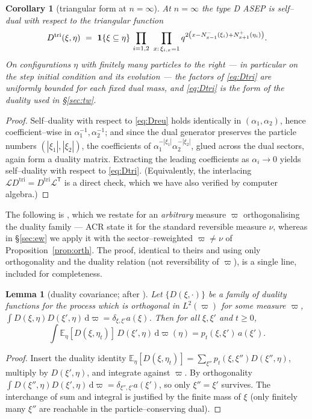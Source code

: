 \documentclass[11pt]{article}
\theoremstyle{plain}
\newtheorem{lemma}[theorem]{Lemma}
\newtheorem{corollary}[theorem]{Corollary}
\theoremstyle{definition}
\theoremstyle{remark}
\newcommand{\E}{\mathbb{E}}\newcommand{\PP}{\mathbb{P}}\newcommand{\dd}{\,\mathrm{d}}
\newcommand{\cL}{\mathcal L}\newcommand{\cO}{\mathcal O}\newcommand{\cE}{\mathcal E}
\begin{document}
\begin{corollary}[triangular form at $n=\infty$]\label{cor:tri}
At $n=\infty$ the type D ASEP is self--dual with respect to the \emph{triangular}
function
\begin{equation}\label{eq:Dtri}
  D^{\mathrm{tri}}(\xi,\eta)\ =\ \mathbf 1\{\xi\subseteq\eta\}\,
  \prod_{i=1,2}\ \prod_{x:\,\xi_{i,x}=1}
  q^{2\left(x-N^-_{x-1}(\xi_i)+N^+_{x+1}(\eta_i)\right)}.
\end{equation}
On configurations $\eta$ with finitely many particles to
the right --- in particular on the step initial condition and its evolution --- the
factors of \eqref{eq:Dtri} are uniformly bounded for each fixed dual mass, and
\eqref{eq:Dtri} is the form of the duality used in \S\ref{sec:tw}.
\end{corollary}
\begin{proof}
Self--duality with respect to \eqref{eq:Dreu} holds identically in
$(\alpha_1,\alpha_2)$, hence coefficient--wise in $\alpha_1^{-1},\alpha_2^{-1}$; and
since the dual generator preserves the particle numbers $(|\xi_1|,|\xi_2|)$, the
coefficients of $\alpha_1^{-|\xi_1|}\alpha_2^{-|\xi_2|}$, glued across the dual
sectors, again form a duality matrix. Extracting the leading coefficients as
$\alpha_i\to0$ yields self--duality with respect to \eqref{eq:Dtri}. (Equivalently,
the interlacing $\cL D^{\mathrm{tri}}=D^{\mathrm{tri}}\cL^{\mathsf T}$ is a direct
check, which we have also verified by computer algebra.)
\end{proof}

The following is \cite[Lem.~2.1]{ACR}, which we restate for an \emph{arbitrary}
measure $\varpi$ orthogonalising the duality family --- ACR state it for the standard
reversible measure $\nu$, whereas in \S\ref{sec:ew} we apply it with the
sector--reweighted $\varpi\ne\nu$ of Proposition~\ref{prop:orth}. The proof, identical
to theirs and using only orthogonality and the duality relation (not reversibility of
$\varpi$), is a single line, included for completeness.

\begin{lemma}[duality covariance; {after \cite[Lem.~2.1]{ACR}}]\label{lem:acr}
Let $\{D(\xi,\cdot)\}$ be a family of duality functions for the process which is
orthogonal in $L^2(\varpi)$ for some measure $\varpi$,
$\int D(\xi,\eta)D(\xi',\eta)\dd\varpi=\delta_{\xi,\xi'}a(\xi)$. Then for all
$\xi,\xi'$ and $t\ge0$,
\[
  \int \E_\eta[D(\xi,\eta_t)]\,D(\xi',\eta)\dd\varpi(\eta)=p_t(\xi,\xi')\,a(\xi').
\]
\end{lemma}
\begin{proof}
Insert the duality identity
$\E_\eta[D(\xi,\eta_t)]=\sum_{\xi''}p_t(\xi,\xi'')D(\xi'',\eta)$, multiply by
$D(\xi',\eta)$, and integrate against $\varpi$. By orthogonality
$\int D(\xi'',\eta)D(\xi',\eta)\dd\varpi=\delta_{\xi'',\xi'}a(\xi')$, so only
$\xi''=\xi'$
survives. The interchange of sum and integral is justified by the finite mass of
$\xi$ (only finitely many $\xi''$ are reachable in the particle--conserving dual).
\end{proof}
\end{document}
